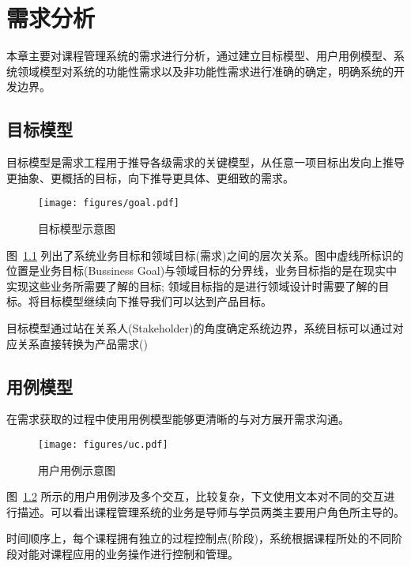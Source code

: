 \chapter{需求分析}

本章主要对课程管理系统的需求进行分析，通过建立目标模型、用户用例模型、系统领域模型对系统的功能性需求以及非功能性需求进行准确的确定，明确系统的开发边界。

\section{目标模型}

目标模型是需求工程用于推导各级需求的关键模型，从任意一项目标出发向上推导更抽象、更概括的目标，向下推导更具体、更细致的需求。

\begin{figure}[!hbp]
  \begin{center}
    \texttt{[image: figures/goal.pdf]}
    \caption{目标模型示意图\label{GoalModel}}
  \end{center}
\end{figure}

图~\ref{GoalModel} 列出了系统业务目标和领域目标(需求)之间的层次关系。图中虚线所标识的位置是业务目标(Bussiness Goal)与领域目标的分界线，业务目标指的是在现实中实现这些业务所需要了解的目标; 领域目标指的是进行领域设计时需要了解的目标。将目标模型继续向下推导我们可以达到产品目标。

目标模型通过站在关系人(Stakeholder)的角度确定系统边界，系统目标可以通过对应关系直接转换为产品需求()

\section{用例模型}

在需求获取的过程中使用用例模型能够更清晰的与对方展开需求沟通。

\begin{figure}[!hbp]
  \begin{center}
    \texttt{[image: figures/uc.pdf]}
    \caption{用户用例示意图\label{UseCase}}
  \end{center}
\end{figure}

图~\ref{UseCase} 所示的用户用例涉及多个交互，比较复杂，下文使用文本对不同的交互进行描述。可以看出课程管理系统的业务是导师与学员两类主要用户角色所主导的。

时间顺序上，每个课程拥有独立的过程控制点(阶段)，系统根据课程所处的不同阶段对能对课程应用的业务操作进行控制和管理。

